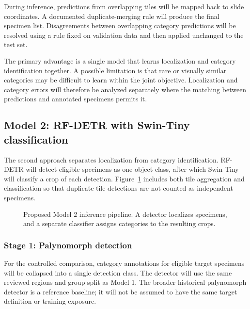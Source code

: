 \documentclass[11pt,letterpaper]{article}
\begin{document}
During inference, predictions from overlapping tiles will be mapped back to slide coordinates. A documented duplicate-merging rule will produce the final specimen list. Disagreements between overlapping category predictions will be resolved using a rule fixed on validation data and then applied unchanged to the test set.

The primary advantage is a single model that learns localization and category identification together. A possible limitation is that rare or visually similar categories may be difficult to learn within the joint objective. Localization and category errors will therefore be analyzed separately where the matching between predictions and annotated specimens permits it.

\subsection{Model 2: RF-DETR with Swin-Tiny classification}
The second approach separates localization from category identification. RF-DETR will detect eligible specimens as one object class, after which Swin-Tiny will classify a crop of each detection. Figure~\ref{fig:model2} includes both tile aggregation and classification so that duplicate tile detections are not counted as independent specimens.

\begin{figure}[htbp]
\centering
{}
\caption{Proposed Model 2 inference pipeline. A detector localizes specimens, and a separate classifier assigns categories to the resulting crops.}
\label{fig:model2}
\end{figure}

\subsubsection{Stage 1: Palynomorph detection}
For the controlled comparison, category annotations for eligible target specimens will be collapsed into a single detection class. The detector will use the same reviewed regions and group split as Model 1. The broader historical palynomorph detector is a reference baseline; it will not be assumed to have the same target definition or training exposure.
\end{document}
